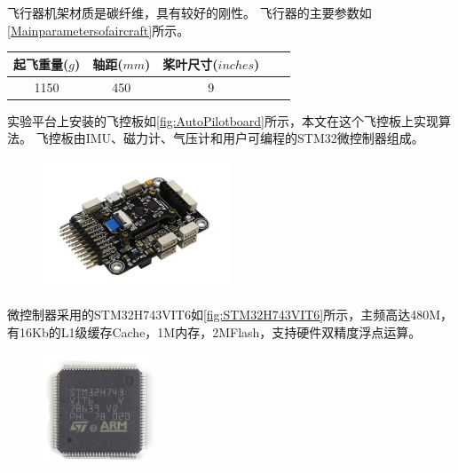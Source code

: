 \documentclass[
  type=master
]{gdutthesis}
\begin{document}
飞行器机架材质是碳纤维，具有较好的刚性。
飞行器的主要参数如\autoref{Mainparametersofaircraft}所示。
\begin{table}[h]
	\label{Mainparametersofaircraft}
	\begin{tabular}{ccccc}
		\toprule
		起飞重量($g$) & 轴距($mm$) & 桨叶尺寸($inches$)\\
		\midrule
		1150 & 450 & 9 \\ 
		\bottomrule 
	\end{tabular}
\end{table}

实验平台上安装的飞控板如\autoref{fig:AutoPilotboard}所示，本文在这个飞控板上实现算法。
飞控板由IMU、磁力计、气压计和用户可编程的STM32微控制器组成。
\begin{figure}[H]
	\centering
	\includegraphics[width=0.5\textwidth]{acfly.jpg}
	\label{fig:AutoPilotboard}
\end{figure}

微控制器采用的STM32H743VIT6如\autoref{fig:STM32H743VIT6}所示，主频高达480M，有16Kb的L1级缓存Cache，1M内存，2MFlash，支持硬件双精度浮点运算。
\begin{figure}[H]
	\centering
	\includegraphics[width=0.3\textwidth]{St-Semiconductor-Chips-Electronic-Component-Lqfp-100-Stm32h743vit6.jpg}
	\label{fig:STM32H743VIT6}
\end{figure}
\end{document}

